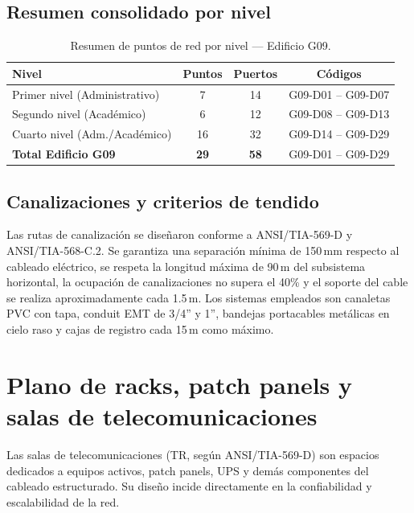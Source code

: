 \subsection{Resumen consolidado por nivel}

\begin{table}[H]
    \centering
    \caption{Resumen de puntos de red por nivel — Edificio G09.}
    \label{tab:resumen_puntos}
    \begin{tabular}{|l|c|c|c|}
        \hline
        \textbf{Nivel} & \textbf{Puntos} & \textbf{Puertos} & \textbf{Códigos} \\
        \hline
        Primer nivel (Administrativo)  &  7 & 14 & G09-D01 -- G09-D07 \\
        Segundo nivel (Académico)      &  6 & 12 & G09-D08 -- G09-D13 \\
        Cuarto nivel (Adm./Académico)  & 16 & 32 & G09-D14 -- G09-D29 \\
        \hline
        \textbf{Total Edificio G09} & \textbf{29} & \textbf{58} &
        G09-D01 -- G09-D29 \\
        \hline
    \end{tabular}
\end{table}

\subsection{Canalizaciones y criterios de tendido}

Las rutas de canalización se diseñaron conforme a \mbox{ANSI/TIA-569-D} y
\mbox{ANSI/TIA-568-C.2}. Se garantiza una separación mínima de 150\,mm respecto
al cableado eléctrico, se respeta la longitud máxima de 90\,m del subsistema
horizontal, la ocupación de canalizaciones no supera el 40\% y el soporte del
cable se realiza aproximadamente cada 1.5\,m. Los sistemas empleados son canaletas
PVC con tapa, conduit EMT de 3/4'' y 1'', bandejas portacables metálicas en cielo
raso y cajas de registro cada 15\,m como máximo.

\section{Plano de racks, patch panels y salas de telecomunicaciones}
\label{sec:plano_racks}

Las salas de telecomunicaciones (TR, según \mbox{ANSI/TIA-569-D}) son espacios
dedicados a equipos activos, patch panels, UPS y demás componentes del cableado
estructurado. Su diseño incide directamente en la confiabilidad y escalabilidad
de la red.

